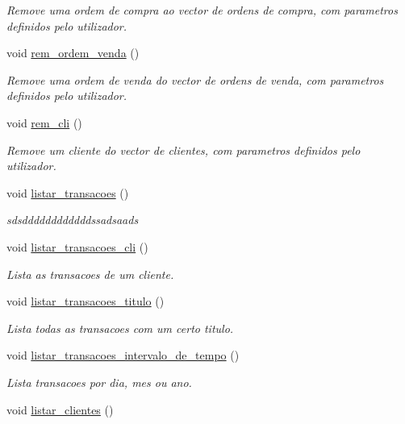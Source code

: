 \begin{DoxyCompactItemize}
\begin{DoxyCompactList}\small\item\em Remove uma ordem de compra ao vector de ordens de compra, com parametros definidos pelo utilizador. \end{DoxyCompactList}\item 
void \hyperlink{class_bolsa_a293578d28d9de84f85844025b47fc505}{rem\+\_\+ordem\+\_\+venda} ()
\begin{DoxyCompactList}\small\item\em Remove uma ordem de venda do vector de ordens de venda, com parametros definidos pelo utilizador. \end{DoxyCompactList}\item 
void \hyperlink{class_bolsa_a3fe70cc3887113b99e09457a62d3fb83}{rem\+\_\+cli} ()
\begin{DoxyCompactList}\small\item\em Remove um cliente do vector de clientes, com parametros definidos pelo utilizador. \end{DoxyCompactList}\item 
void \hyperlink{class_bolsa_a4676ec9295a14426f3c70e91dd36fde1}{listar\+\_\+transacoes} ()
\begin{DoxyCompactList}\small\item\em sdsddddddddddddssadsaads \end{DoxyCompactList}\item 
void \hyperlink{class_bolsa_ad96a358bf03c103f55b8139da8a0d61a}{listar\+\_\+transacoes\+\_\+cli} ()
\begin{DoxyCompactList}\small\item\em Lista as transacoes de um cliente. \end{DoxyCompactList}\item 
void \hyperlink{class_bolsa_aeac084d57bf9382c83516f1f0c043936}{listar\+\_\+transacoes\+\_\+titulo} ()
\begin{DoxyCompactList}\small\item\em Lista todas as transacoes com um certo titulo. \end{DoxyCompactList}\item 
void \hyperlink{class_bolsa_acb012fa60aa074fd861168ca3aedadd0}{listar\+\_\+transacoes\+\_\+intervalo\+\_\+de\+\_\+tempo} ()
\begin{DoxyCompactList}\small\item\em Lista transacoes por dia, mes ou ano. \end{DoxyCompactList}\item 
void \hyperlink{class_bolsa_aba662f57e78213bee6de3db7c06c7293}{listar\+\_\+clientes} ()

\end{DoxyCompactItemize}
